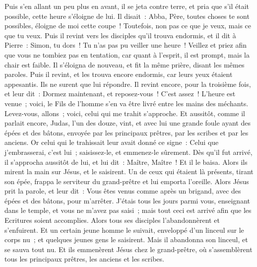 \begin{multicols}{2}
Puis s'en allant un peu plus en avant, il se jeta contre terre, et pria que s'il était possible, cette heure s'éloigne de lui.
Il disait~: Abba, Père, toutes choses te sont possibles, éloigne de moi cette coupe~! Toutefois, non pas ce que je veux, mais ce que tu veux.
Puis il revint vers les disciples qu'il trouva endormis, et il dit à Pierre~: Simon, tu dors~! Tu n'as pas pu veiller une heure~!
Veillez et priez afin que vous ne tombiez pas en tentation, car quant à l'esprit, il est prompt, mais la chair est faible.
Il s'éloigna de nouveau, et fit la même prière, disant les mêmes paroles.
Puis il revint, et les trouva encore endormis, car leurs yeux étaient appesantis. Ils ne surent que lui répondre.
Il revint encore, pour la troisième fois, et leur dit~: Dormez maintenant, et reposez-vous~! C'est assez~! L'heure est venue~; voici, le Fils de l'homme s'en va être livré entre les mains des méchants.
Levez-vous, allons~; voici, celui qui me trahit s'approche.
Et aussitôt, comme il parlait encore, Judas, l'un des douze, vint, et avec lui une grande foule ayant des épées et des bâtons, envoyée par les principaux prêtres, par les scribes et par les anciens.
Or celui qui le trahissait leur avait donné ce signe~: Celui que j'embrasserai, c'est lui~; saisissez-le, et emmenez-le sûrement.
Dès qu'il fut arrivé, il s'approcha aussitôt de lui, et lui dit~: Maître, Maître~! Et il le baisa.
Alors ils mirent la main sur Jésus, et le saisirent.
Un de ceux qui étaient là présents, tirant son épée, frappa le serviteur du grand-prêtre et lui emporta l'oreille.
Alors Jésus prit la parole, et leur dit~: Vous êtes venus comme après un brigand, avec des épées et des bâtons, pour m'arrêter.
J'étais tous les jours parmi vous, enseignant dans le temple, et vous ne m'avez pas saisi~; mais tout ceci est arrivé afin que les Ecritures soient accomplies.
Alors tous ses disciples l'abandonnèrent et s'enfuirent.
Et un certain jeune homme le suivait, enveloppé d'un linceul sur le corps nu~; et quelques jeunes gens le saisirent.
Mais il abandonna son linceul, et se sauva tout nu.
Et ils emmenèrent Jésus chez le grand-prêtre, où s'assemblèrent tous les principaux prêtres, les anciens et les scribes.

\end{multicols}
